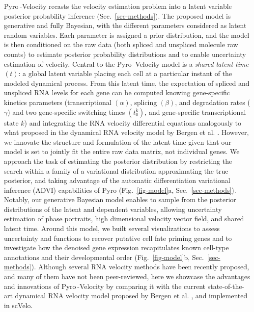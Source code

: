 \documentclass[
  sn-mathphys-num,
  lineno,
  twocolumn]{sn-jnl}
\begin{document}
Pyro -Velocity recasts the velocity estimation problem into a latent
variable posterior probability inference (Sec.~\ref{sec-methods}). The
proposed model is generative and fully Bayesian, with the different
parameters considered as latent random variables. Each parameter is
assigned a prior distribution, and the model is then conditioned on the
raw data (both spliced and unspliced molecule raw counts) to estimate
posterior probability distributions and to enable uncertainty estimation
of velocity. Central to the Pyro -Velocity model is a \emph{shared
latent time} \((t)\): a global latent variable placing each cell at a
particular instant of the modeled dynamical process. From this latent
time, the expectation of spliced and unspliced RNA levels for each gene
can be computed knowing gene-specific kinetics parameters
(transcriptional \((\alpha)\), splicing \((\beta)\), and degradation
rates (\(\gamma\)) and two gene-specific switching times
\((t_{0}^{k})\), and gene-specific transcriptional state \(k\)) and
integrating the RNA velocity differential equations analogously to what
proposed in the dynamical RNA velocity model by Bergen et al.
\citep{Bergen2020-pj, Li2021-qa}. However, we innovate the structure and
formulation of the latent time given that our model is set to jointly
fit the entire raw data matrix, not individual genes. We approach the
task of estimating the posterior distribution by restricting the search
within a family of a variational distribution approximating the true
posterior, and taking advantage of the automatic differentiation
variational inference (ADVI) capabilities of Pyro
\citep{Bingham2018-id, Kucukelbir2016-bk} (Fig.~\ref{fig-model}a,
Sec.~\ref{sec-methods}). Notably, our generative Bayesian model enables
to sample from the posterior distributions of the latent and dependent
variables, allowing uncertainty estimation of phase portraits, high
dimensional velocity vector field, and shared latent time. Around this
model, we built several visualizations to assess uncertainty and
functions to recover putative cell fate priming genes and to investigate
how the denoised gene expression recapitulates known cell-type
annotations and their developmental order (Fig.~\ref{fig-model}b,
Sec.~\ref{sec-methods}). Although several RNA velocity methods
\citep{Gayoso2024-fz, Gorin2022-il, Gu2022-rh, Cui2022-em, Gao2022-jq}
have been recently proposed, and many of them have not been
peer-reviewed, here we showcase the advantages and innovations of
Pyro -Velocity by comparing it with the current state-of-the-art
dynamical RNA velocity model proposed by Bergen et al.
\citep{Bergen2020-pj}, and implemented in scVelo.
\end{document}
